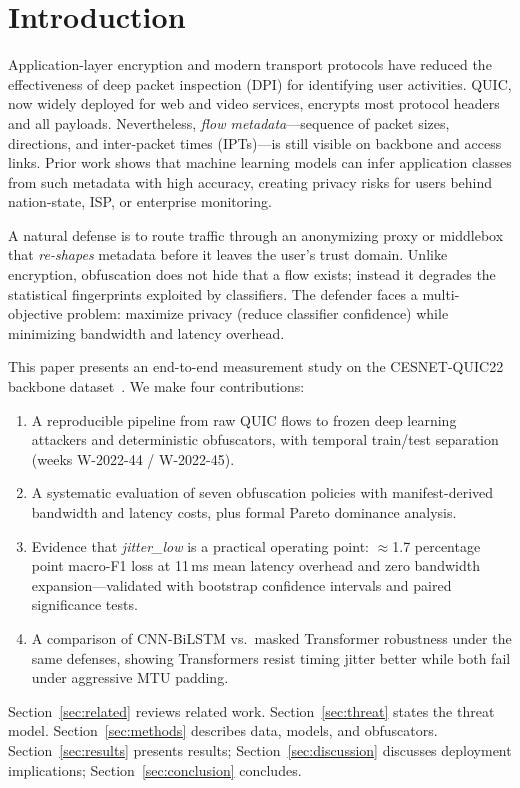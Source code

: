 \section{Introduction}
\label{sec:intro}

Application-layer encryption and modern transport protocols have reduced the
effectiveness of deep packet inspection (DPI) for identifying user activities.
QUIC, now widely deployed for web and video services, encrypts most protocol
headers and all payloads. Nevertheless, \emph{flow metadata}---sequence of packet
sizes, directions, and inter-packet times (IPTs)---is still visible on backbone and
access links. Prior work shows that machine learning models can infer application
classes from such metadata with high accuracy, creating privacy risks for users
behind nation-state, ISP, or enterprise monitoring.

A natural defense is to route traffic through an anonymizing proxy or middlebox that
\emph{re-shapes} metadata before it leaves the user's trust domain. Unlike
encryption, obfuscation does not hide that a flow exists; instead it degrades the
statistical fingerprints exploited by classifiers. The defender faces a multi-objective
problem: maximize privacy (reduce classifier confidence) while minimizing bandwidth
and latency overhead.

This paper presents an end-to-end measurement study on the CESNET-QUIC22 backbone
dataset~\cite{cesnet_quic22}. We make four contributions:
\begin{enumerate}
  \item A reproducible pipeline from raw QUIC flows to frozen deep learning attackers
        and deterministic obfuscators, with temporal train/test separation
        (weeks W-2022-44 / W-2022-45).
  \item A systematic evaluation of seven obfuscation policies with manifest-derived
        bandwidth and latency costs, plus formal Pareto dominance analysis.
  \item Evidence that \emph{jitter\_low} is a practical operating point: $\approx$1.7
        percentage point macro-F1 loss at 11\,ms mean latency overhead and zero
        bandwidth expansion---validated with bootstrap confidence intervals and paired
        significance tests.
  \item A comparison of CNN-BiLSTM vs.\ masked Transformer robustness under the same
        defenses, showing Transformers resist timing jitter better while both fail under
        aggressive MTU padding.
\end{enumerate}

Section~\ref{sec:related} reviews related work. Section~\ref{sec:threat} states the
threat model. Section~\ref{sec:methods} describes data, models, and obfuscators.
Section~\ref{sec:results} presents results; Section~\ref{sec:discussion} discusses
deployment implications; Section~\ref{sec:conclusion} concludes.

